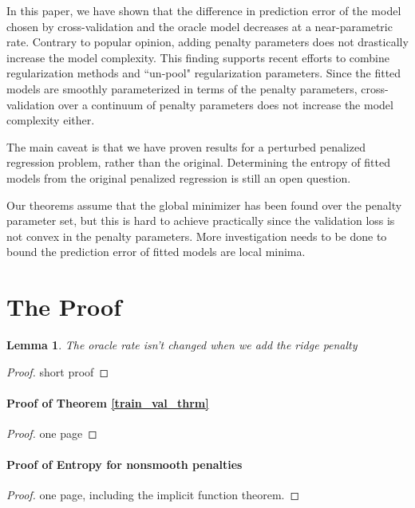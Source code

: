 \documentclass[12pt]{article}
\newtheorem{lemma}{Lemma}
\begin{document}
In this paper, we have shown that the difference in prediction error of the model chosen by cross-validation and the oracle model decreases at a near-parametric rate. Contrary to popular opinion, adding penalty parameters does not drastically increase the model complexity. This finding supports recent efforts to combine regularization methods and ``un-pool" regularization parameters. Since the fitted models are smoothly parameterized in terms of the penalty parameters, cross-validation over a continuum of penalty parameters does not increase the model complexity either.

The main caveat is that we have proven results for a perturbed penalized regression problem, rather than the original. Determining the entropy of fitted models from the original penalized regression is still an open question.

Our theorems assume that the global minimizer has been found over the penalty parameter set, but this is hard to achieve practically since the validation loss is not convex in the penalty parameters. More investigation needs to be done to bound the prediction error of fitted models are local minima.

\section{The Proof} \label{sec:proofs}

\begin{lemma}
\label{oracle_maintained}
The oracle rate isn't changed when we add the ridge penalty
\end{lemma}
\begin{proof}
short proof
\end{proof}

\paragraph{Proof of Theorem \ref{train_val_thrm}}
\begin{proof}
one page
\end{proof}

\paragraph{Proof of Entropy for nonsmooth penalties}
\begin{proof}
one page, including the implicit function theorem.
\end{proof}
\end{document}
